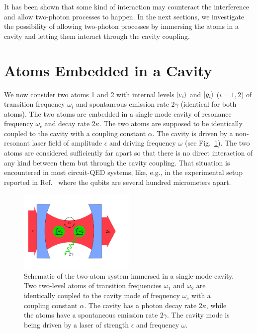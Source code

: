 It has been shown that some kind of interaction may counteract the interference and allow two-photon processes to happen\cite{Var92}. In the next sections, we investigate the possibility of allowing two-photon processes by immersing the atoms in a cavity and letting them interact through the cavity coupling.

\section{Atoms Embedded in a Cavity} \label{sec-QEDMod}

We now consider two atoms 1 and 2 with internal levels $| e_i \rangle$ and $| g_i \rangle$ ($i=1,2$) of transition frequency $\omega_i$ and spontaneous emission rate $2\gamma$ (identical for both atoms). The two atoms are embedded in a single mode cavity of resonance frequency $\omega_c$ and decay rate $2\kappa$. The two atoms are supposed to be identically coupled to the cavity with a coupling constant $\alpha$. The cavity is driven by a non-resonant laser field of amplitude $\epsilon$ and driving frequency $\omega$ (see Fig.~\ref{fig-setup}). The two atoms are considered sufficiently far apart so that there is no direct interaction of any kind between them but through the cavity coupling. That situation is encountered in most circuit-QED systems, like, e.g., in the experimental setup reported in Ref.~\cite{Fin09} where the qubits are several hundred micrometers apart.

\begin{figure}
    \center
    \includegraphics[width=0.5\textwidth]{Images/chap5/setup.pdf}
    \caption[Schematic of the two-atom system]{Schematic of the two-atom system immersed in a single-mode cavity. Two two-level atoms of transition frequencies $\omega_1$ and $\omega_2$ are identically coupled to the cavity mode of frequency $\omega_c$ with a coupling constant $\alpha$. The cavity has a photon decay rate $2\kappa$, while the atoms have a spontaneous emission rate $2\gamma$. The cavity mode is being driven by a laser of strength $\epsilon$ and frequency $\omega$.}
    \label{fig-setup}
\end{figure}

